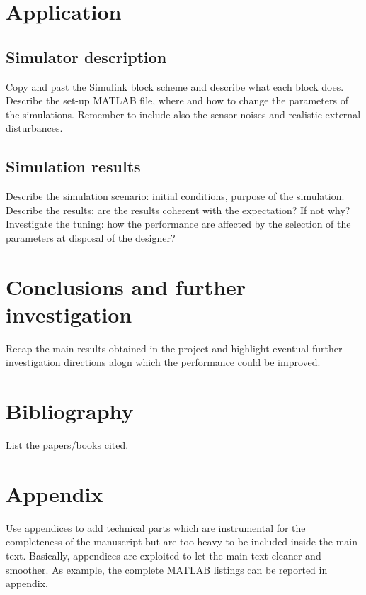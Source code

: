 \documentclass[]{report}
\begin{document}
\chapter{Application}

\section{Simulator description}
Copy and past the Simulink block scheme and describe what each block does. Describe the set-up MATLAB file, where and how to change the parameters of the simulations. Remember to include also the sensor noises and realistic external disturbances.

\section{Simulation results}
Describe the simulation scenario: initial conditions, purpose of the simulation. Describe the results: are the results coherent with the expectation? If not why? Investigate the tuning: how the performance are affected by the selection of the parameters at disposal of the designer?

\chapter{Conclusions and further investigation}
Recap the main results obtained in the project and highlight eventual further investigation directions alogn which the performance could be improved. 

\newpage
\chapter*{Bibliography}
List the papers/books cited.

\newpage
\appendix
\chapter*{Appendix}
Use appendices to add technical parts which are instrumental for the completeness of the manuscript but are too heavy to be included inside the main text. Basically, appendices are exploited to let the main text cleaner and smoother. As example, the complete MATLAB listings can be reported in appendix.
\end{document}
